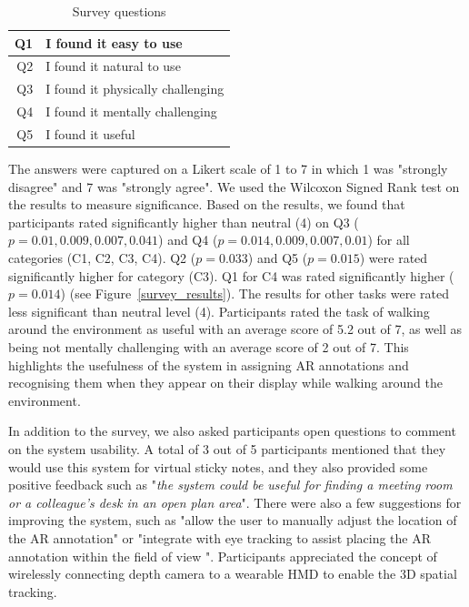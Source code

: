 \begin{table}[ht]
  \centering
	\caption{Survey questions}
    \label{table:questions}
    \begin{tabular}{r l}
    \hline
    Q1 & I found it easy to use \\ \hline
    Q2 & I found it natural to use \\ \hline
    Q3 & I found it physically challenging \\ \hline
    Q4 & I found it mentally challenging \\ \hline
    Q5 & I found it useful \\ \hline
    \end{tabular}
\end{table}

The answers were captured on a Likert scale of 1 to 7 in which 1 was "strongly disagree" and 7 was "strongly agree". We used the Wilcoxon Signed Rank test on the results to measure significance. Based on the results, we found that participants rated significantly higher than neutral (4) on Q3 ($p=0.01, 0.009, 0.007, 0.041$) and Q4 ($p=0.014, 0.009, 0.007, 0.01$) for all categories (C1, C2, C3, C4). Q2 ($p=0.033$) and Q5 ($p=0.015$) were rated significantly higher for category (C3). Q1 for C4 was rated significantly higher ($p=0.014$) (see Figure~\ref{survey_results}). The results  for other tasks were rated less significant than neutral level (4). Participants rated the task of walking around the environment as useful with an average score of 5.2 out of 7, as well as being not mentally challenging with an average score of 2 out of 7. This highlights the usefulness of the system in assigning AR annotations and recognising them when they appear on their display while walking around the environment. 

In addition to the survey, we also asked participants open questions to comment on the system usability. A total of 3 out of 5 participants mentioned that they would use this system for virtual sticky notes, and they also provided some positive feedback such as "\textit{the system could be useful for finding a meeting room or a colleague's desk in an open plan area}". There were also a few suggestions for improving the system, such as "allow the user to manually adjust the location of the AR annotation" or "integrate with eye tracking to assist placing the AR annotation within the field of view ". Participants appreciated  the concept of wirelessly connecting depth camera to a wearable HMD to enable the 3D spatial tracking.    



